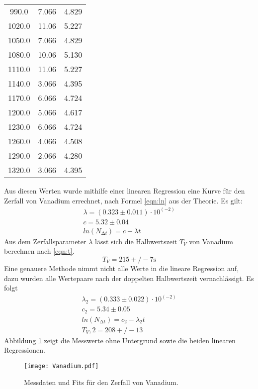 \begin{table}
\begin{tabular}{c c c}
  990.0   & 7.066  & 4.829  \\
  1020.0  & 11.06  & 5.227  \\
  1050.0  & 7.066  & 4.829  \\
  1080.0  & 10.06  & 5.130  \\
  1110.0  & 11.06  & 5.227  \\
  1140.0  & 3.066  & 4.395  \\
  1170.0  & 6.066  & 4.724  \\
  1200.0  & 5.066  & 4.617  \\
  1230.0  & 6.066  & 4.724  \\
  1260.0  & 4.066  & 4.508  \\
  1290.0  & 2.066  & 4.280  \\
  1320.0  & 3.066  & 4.395  \\
  \bottomrule
 \end{tabular}
\end{table}

\noindent Aus diesen Werten wurde mithilfe einer linearen Regression
eine Kurve für den Zerfall von Vanadium errechnet, nach Formel \eqref{eqn:ln}
aus der Theorie. Es gilt:
\begin{align*}
    \lambda = (0.323 \pm 0.011) \cdot 10^(-2) \\
    c = 5.32 \pm 0.04 \\
    ln(N_{\increment t}) = c - \lambda t 
\end{align*}
Aus dem Zerfallsparameter $\lambda$ lässt sich die Halbwertszeit $T_V$ von
Vanadium berechnen nach \eqref{eqn:t}.
\begin{equation*}
    T_V = 215+/-7 \si{\s}
\end{equation*}
Eine genauere Methode nimmt nicht alle Werte in die lineare Regression auf,
dazu wurden alle Wertepaare nach der doppelten Halbwertszeit vernachlässigt.
Es folgt
\begin{align*}
    \lambda_2 = (0.333 \pm 0.022) \cdot 10^(-2) \\
    c_2 = 5.34 \pm 0.05 \\
    ln(N_{\increment t}) = c_2 - \lambda_2 t \\
    T_V,2 = 208+/-13
\end{align*}
Abbildung \ref{fig:vankurve}
zeigt die Messwerte ohne Untergrund sowie die beiden linearen Regressionen.

\begin{figure}
 \centering
 \texttt{[image: Vanadium.pdf]}
 \caption{Messdaten und Fits für den Zerfall von Vanadium.}
 \label{fig:vankurve}
\end{figure}

